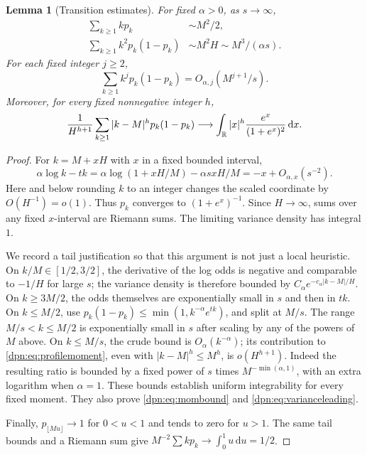 \documentclass[11pt]{article}
\numberwithin{equation}{section}
\newtheorem{lemma}[theorem]{Lemma}
\theoremstyle{definition}\newtheorem{definition}[theorem]{Definition}
\theoremstyle{remark}\newtheorem{remark}[theorem]{Remark}
\newcommand{\dd}{\,\mathrm d}\newcommand{\ii}{\mathrm i}
\begin{document}
\begin{lemma}[Transition estimates]\label{dpn:lem:scales}
For fixed $\alpha>0$, as $s\to\infty$,
\begin{align}
 \sum_{k\ge1}kp_k&\sim M^2/2,\label{dpn:eq:meanleading}\\
 \sum_{k\ge1}k^2p_k(1-p_k)&\sim M^2H
                    \sim M^3/(\alpha s).\label{dpn:eq:varianceleading}
\end{align}
For each fixed integer $j\ge2$,
\begin{equation}\label{dpn:eq:mombound}
 \sum_{k\ge1}k^j p_k(1-p_k)=O_{\alpha,j}(M^{j+1}/s).
\end{equation}
Moreover, for every fixed nonnegative integer $h$,
\begin{equation}\label{dpn:eq:profilemoment}
 \frac1{H^{h+1}}\sum_{k\ge1}|k-M|^h p_k(1-p_k)
 \longrightarrow
 \int_\R |x|^h\frac{e^x}{(1+e^x)^2}\dd x.
\end{equation}
\end{lemma}
\begin{proof}
For $k=M+xH$ with $x$ in a fixed bounded interval,
\[
 \alpha\log k-tk
 =\alpha\log(1+xH/M)-\alpha s xH/M
 =-x+O_{\alpha,x}(s^{-2}).
\]
Here and below rounding $k$ to an integer changes the scaled coordinate by
$O(H^{-1})=o(1)$. Thus $p_k$ converges to $(1+e^x)^{-1}$.
Since $H\to\infty$, sums over any fixed $x$-interval are Riemann sums.
The limiting variance density has integral $1$.

We record a tail justification so that this argument is not just a local
heuristic. On $k/M\in[1/2,3/2]$, the derivative of the log odds is
negative and comparable to $-1/H$ for large $s$; the variance density is
therefore bounded by $C_\alpha e^{-c_\alpha|k-M|/H}$.
On $k\ge3M/2$, the odds themselves are exponentially small in $s$ and then
in $tk$. On $k\le M/2$, use
$p_k(1-p_k)\le\min(1,k^{-\alpha}e^{tk})$, and split at $M/s$.
The range $M/s<k\le M/2$ is exponentially small in $s$ after scaling by
any of the powers of $M$ above. On $k\le M/s$, the crude bound is
$O_\alpha(k^{-\alpha})$; its contribution to \eqref{dpn:eq:profilemoment},
even with $|k-M|^h\le M^h$, is $o(H^{h+1})$.
Indeed the resulting ratio is bounded by a fixed power of $s$ times
$M^{-\min(\alpha,1)}$, with an extra logarithm when $\alpha=1$.
These bounds establish uniform integrability for every fixed moment.
They also prove \eqref{dpn:eq:mombound} and \eqref{dpn:eq:varianceleading}.

Finally, $p_{\lfloor Mu\rfloor}\to1$ for $0<u<1$ and tends to zero for
$u>1$. The same tail bounds and a Riemann sum give
$M^{-2}\sum k p_k\to\int_0^1u\dd u=1/2$.
\end{proof}
\end{document}
